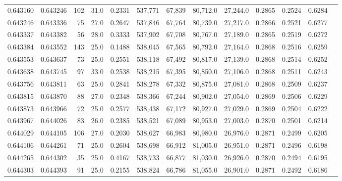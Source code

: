 \begin{tabular}{rrrrrrrrrrrrr}
0.643160 & 0.643246 &   102 & 31.0 &                                     0.2331 & 537,771 &  67,839 &  80,712.0 &  27,244.0 & 0.2865 & 0.2524 & 0.6284 \\
0.643246 & 0.643336 &    75 & 27.0 &                                     0.2647 & 537,846 &  67,764 &  80,739.0 &  27,217.0 & 0.2866 & 0.2521 & 0.6277 \\
0.643337 & 0.643382 &    56 & 28.0 &                                     0.3333 & 537,902 &  67,708 &  80,767.0 &  27,189.0 & 0.2865 & 0.2519 & 0.6272 \\
0.643384 & 0.643552 &   143 & 25.0 &                                     0.1488 & 538,045 &  67,565 &  80,792.0 &  27,164.0 & 0.2868 & 0.2516 & 0.6259 \\
0.643553 & 0.643637 &    73 & 25.0 &                                     0.2551 & 538,118 &  67,492 &  80,817.0 &  27,139.0 & 0.2868 & 0.2514 & 0.6252 \\
0.643638 & 0.643745 &    97 & 33.0 &                                     0.2538 & 538,215 &  67,395 &  80,850.0 &  27,106.0 & 0.2868 & 0.2511 & 0.6243 \\
0.643756 & 0.643811 &    63 & 25.0 &                                     0.2841 & 538,278 &  67,332 &  80,875.0 &  27,081.0 & 0.2868 & 0.2509 & 0.6237 \\
0.643815 & 0.643870 &    88 & 27.0 &                                     0.2348 & 538,366 &  67,244 &  80,902.0 &  27,054.0 & 0.2869 & 0.2506 & 0.6229 \\
0.643873 & 0.643966 &    72 & 25.0 &                                     0.2577 & 538,438 &  67,172 &  80,927.0 &  27,029.0 & 0.2869 & 0.2504 & 0.6222 \\
0.643967 & 0.644026 &    83 & 26.0 &                                     0.2385 & 538,521 &  67,089 &  80,953.0 &  27,003.0 & 0.2870 & 0.2501 & 0.6214 \\
0.644029 & 0.644105 &   106 & 27.0 &                                     0.2030 & 538,627 &  66,983 &  80,980.0 &  26,976.0 & 0.2871 & 0.2499 & 0.6205 \\
0.644106 & 0.644261 &    71 & 25.0 &                                     0.2604 & 538,698 &  66,912 &  81,005.0 &  26,951.0 & 0.2871 & 0.2496 & 0.6198 \\
0.644265 & 0.644302 &    35 & 25.0 &                                     0.4167 & 538,733 &  66,877 &  81,030.0 &  26,926.0 & 0.2870 & 0.2494 & 0.6195 \\
0.644303 & 0.644393 &    91 & 25.0 &                                     0.2155 & 538,824 &  66,786 &  81,055.0 &  26,901.0 & 0.2871 & 0.2492 & 0.6186 \\

\end{tabular}
